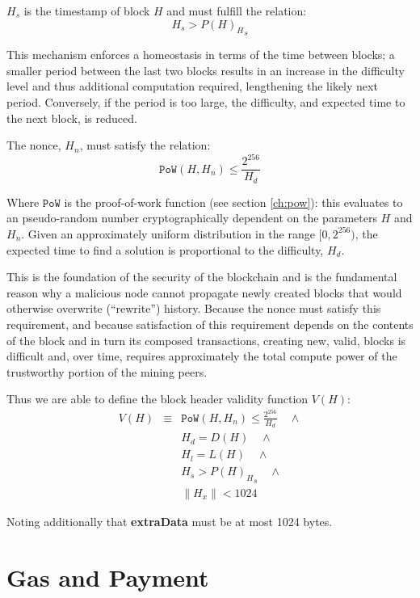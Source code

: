 \documentclass[9pt,oneside]{amsart}
\begin{document}
\begin{multicols}{2}
$H_s$ is the timestamp of block $H$ and must fulfill the relation:
\begin{equation}
H_s > {P(H)_H}_s
\end{equation}

This mechanism enforces a homeostasis in terms of the time between blocks; a smaller period between the last two blocks results in an increase in the difficulty level and thus additional computation required, lengthening the likely next period. Conversely, if the period is too large, the difficulty, and expected time to the next block, is reduced.

The nonce, $H_n$, must satisfy the relation:
\begin{equation}
\mathtt{PoW}(H, H_n) \leqslant \frac{2^{256}}{H_d}
\end{equation}

Where $\mathtt{PoW}$ is the proof-of-work function (see section \ref{ch:pow}): this evaluates to an pseudo-random number cryptographically dependent on the parameters $H$ and $H_n$. Given an approximately uniform distribution in the range $[0, 2^{256})$, the expected time to find a solution is proportional to the difficulty, $H_d$.

This is the foundation of the security of the blockchain and is the fundamental reason why a malicious node cannot propagate newly created blocks that would otherwise overwrite (``rewrite'') history. Because the nonce must satisfy this requirement, and because satisfaction of this requirement depends on the contents of the block and in turn its composed transactions, creating new, valid, blocks is difficult and, over time, requires approximately the total compute power of the trustworthy portion of the mining peers.

Thus we are able to define the block header validity function $V(H)$:
\begin{eqnarray}
V(H) & \equiv & \mathtt{PoW}(H, H_n) \leqslant \frac{2^{256}}{H_d} \quad \wedge \\
& & H_d = D(H) \quad \wedge \\
& & H_l = L(H) \quad \wedge \\
& & H_s > {P(H)_H}_s \quad \wedge \\
& & \lVert H_x \rVert < 1024
\end{eqnarray}

Noting additionally that \textbf{extraData} must be at most 1024 bytes.

\section{Gas and Payment} \label{ch:payment}


\end{multicols}
\end{document}
